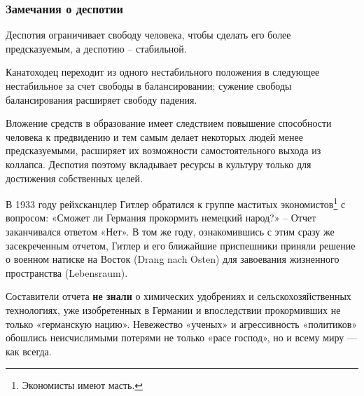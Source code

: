 \subsubsection[Замечания о деспотии]{Замечания о деспотии}

Деспотия ограничивает свободу человека, чтобы сделать его более предсказуемым, а деспотию – стабильной.

Канатоходец переходит из одного нестабильного положения в следующее нестабильное за счет свободы в балансировании;
сужение свободы балансирования расширяет свободу падения.


Вложение средств в образование имеет следствием повышение способности человека к предвидению и тем самым делает
некоторых людей менее предсказуемыми, расширяет их возможности самостоятельного выхода из коллапса. Деспотия поэтому
вкладывает ресурсы в культуру только для достижения собственных целей.

В 1933 году рейхсканцлер Гитлер обратился к группе маститых
экономистов\footnote{Экономисты имеют масть.} с вопросом: «Сможет ли
Германия прокормить немецкий народ?» – Отчет заканчивался ответом «Нет». В том же году, ознакомившись с этим сразу же
засекреченным отчетом, Гитлер и его ближайшие приспешники приняли решение о военном натиске на Восток
(Drang nach Osten) для завоевания жизненного пространства (Lebensraum).

Составители отчета \textbf{не знали} о
химических удобрениях и сельскохозяйственных технологиях, уже изобретенных в Германии и впоследствии прокормивших не
только «германскую нацию». Невежество «ученых» и агрессивность «политиков» обошлись неисчислимыми потерями не только
«расе господ», но и всему миру — как всегда.
%
